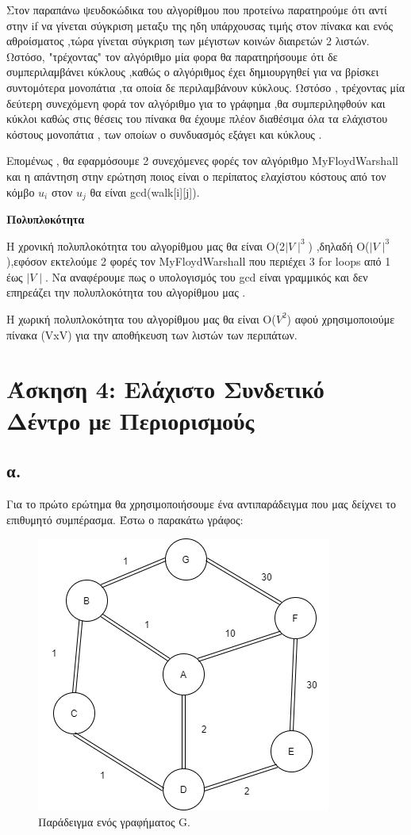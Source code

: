 \documentclass[12pt,a4paper]{article}
\begin{document}
\par Στον παραπάνω ψευδοκώδικα του αλγορίθμου που προτείνω παρατηρούμε ότι αντί στην if να γίνεται σύγκριση μεταξυ της ηδη υπάρχουσας τιμής στον πίνακα και ενός αθροίσματος ,τώρα γίνεται σύγκριση των μέγιστων κοινών διαιρετών 2 λιστών. Ωστόσο, "τρέχοντας" τον αλγόριθμο μία φορα θα παρατηρήσουμε ότι δε συμπεριλαμβάνει κύκλους ,καθώς ο αλγόριθμος έχει δημιουργηθεί για να βρίσκει συντομότερα μονοπάτια ,τα οποία δε περιλαμβάνουν κύκλους. Ωστόσο , τρέχοντας μία δεύτερη συνεχόμενη φορά τον αλγόριθμο για το γράφημα ,θα συμπεριληφθούν και κύκλοι καθώς στις θέσεις του πίνακα θα έχουμε πλέον διαθέσιμα όλα τα ελάχιστου κόστους μονοπάτια , των οποίων ο συνδυασμός εξάγει και κύκλους .
\par Επομένως , θα εφαρμόσουμε 2 συνεχόμενες φορές τον αλγόριθμο MyFloydWarshall και η απάντηση στην ερώτηση ποιος είναι ο περίπατος ελαχίστου κόστους από τον κόμβο $u_i$ στον $u_j$ θα είναι gcd(walk[i][j]).
\begin{center}
    \textbf{Πολυπλοκότητα}
\end{center}

\par Η χρονική πολυπλοκότητα του αλγορίθμου μας θα είναι Ο(2$\mid V\mid ^3$) ,δηλαδή Ο($\mid V\mid ^3$),εφόσον εκτελούμε 2 φορές τον MyFloydWarshall που περιέχει 3 for loops από 1 έως $\mid V\mid$. Να αναφέρουμε πως ο υπολογισμός του gcd είναι γραμμικός και δεν επηρεάζει την πολυπλοκότητα του αλγορίθμου μας .
\par Η χωρική πολυπλοκότητα του αλγορίθμου μας θα είναι O($V^2$) αφού χρησιμοποιούμε πίνακα (VxV) για την αποθήκευση των λιστών των περιπάτων.

\section*{Άσκηση 4: Ελάχιστο Συνδετικό Δέντρο με Περιορισμούς }
\subsection*{α.}
Για το πρώτο ερώτημα θα χρησιμοποιήσουμε ένα αντιπαράδειγμα που μας δείχνει το επιθυμητό συμπέρασμα. Έστω ο παρακάτω γράφος:
\begin{figure}[h]
    \centering
    \includegraphics[scale = 0.6]{images/ask4(1).png}
    \caption{Παράδειγμα ενός γραφήματος G.}
    \label{fig2}
\end{figure}
\end{document}
